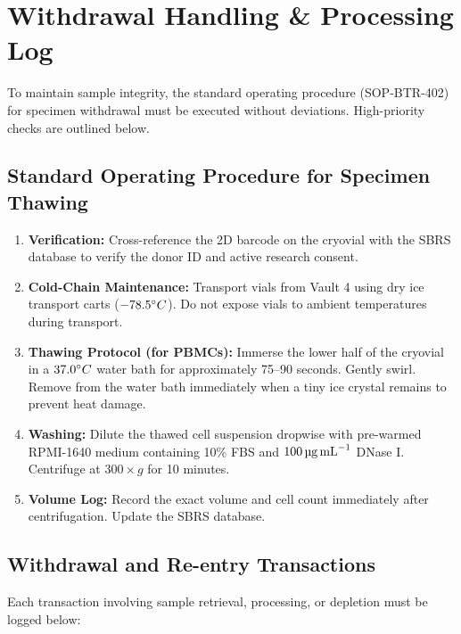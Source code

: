 \section{Withdrawal Handling \& Processing Log}

To maintain sample integrity, the standard operating procedure (SOP-BTR-402) for specimen withdrawal must be executed without deviations. High-priority checks are outlined below.

\subsection{Standard Operating Procedure for Specimen Thawing}
\begin{enumerate}
  \item \textbf{Verification:} Cross-reference the 2D barcode on the cryovial with the SBRS database to verify the donor ID and active research consent.
  \item \textbf{Cold-Chain Maintenance:} Transport vials from Vault 4 using dry ice transport carts (\(-78.5\degC\)). Do not expose vials to ambient temperatures during transport.
  \item \textbf{Thawing Protocol (for PBMCs):} Immerse the lower half of the cryovial in a \(37.0\degC\) water bath for approximately 75--90 seconds. Gently swirl. Remove from the water bath immediately when a tiny ice crystal remains to prevent heat damage.
  \item \textbf{Washing:} Dilute the thawed cell suspension dropwise with pre-warmed RPMI-1640 medium containing 10\% FBS and \(100\,\text{\textmu g\,mL}^{-1}\) DNase I. Centrifuge at \(300 \times g\) for 10 minutes.
  \item \textbf{Volume Log:} Record the exact volume and cell count immediately after centrifugation. Update the SBRS database.
\end{enumerate}

\subsection{Withdrawal and Re-entry Transactions}
Each transaction involving sample retrieval, processing, or depletion must be logged below:

